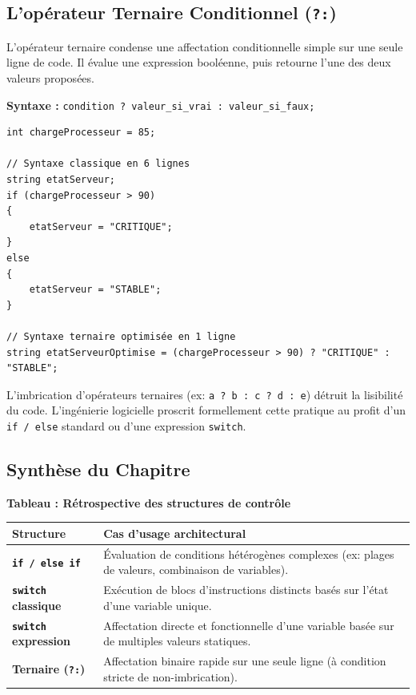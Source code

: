 \subsection{L'opérateur Ternaire Conditionnel (\texttt{?:})}

L'opérateur ternaire condense une affectation conditionnelle simple sur une seule ligne de code. Il évalue une expression booléenne, puis retourne l'une des deux valeurs proposées.

\textbf{Syntaxe :} \texttt{condition ? valeur\_si\_vrai : valeur\_si\_faux;}

\begin{lstlisting}[caption={Optimisation par opérateur ternaire}]
int chargeProcesseur = 85;

// Syntaxe classique en 6 lignes
string etatServeur;
if (chargeProcesseur > 90)
{
    etatServeur = "CRITIQUE";
}
else
{
    etatServeur = "STABLE";
}

// Syntaxe ternaire optimisée en 1 ligne
string etatServeurOptimise = (chargeProcesseur > 90) ? "CRITIQUE" : "STABLE";
\end{lstlisting}

\begin{tcolorbox}[colback=backcolour,colframe=stringcolor,title=\textbf{Anti-pattern : Les ternaires imbriqués}]
    L'imbrication d'opérateurs ternaires (ex: \texttt{a ? b : c ? d : e}) détruit la lisibilité du code. L'ingénierie logicielle proscrit formellement cette pratique au profit d'un \texttt{if / else} standard ou d'une expression \texttt{switch}.
\end{tcolorbox}

\subsection{Synthèse du Chapitre}

\begin{center}
    \textbf{Tableau : Rétrospective des structures de contrôle} \\[0.3cm]
    \begin{tabular}{@{}lp{10cm}@{}}
        \toprule
        \textbf{Structure} & \textbf{Cas d'usage architectural} \\
        \midrule
        \textbf{\texttt{if / else if}} & Évaluation de conditions hétérogènes complexes (ex: plages de valeurs, combinaison de variables). \\
        \textbf{\texttt{switch} classique} & Exécution de blocs d'instructions distincts basés sur l'état d'une variable unique. \\
        \textbf{\texttt{switch} expression} & Affectation directe et fonctionnelle d'une variable basée sur de multiples valeurs statiques. \\
        \textbf{Ternaire (\texttt{?:})} & Affectation binaire rapide sur une seule ligne (à condition stricte de non-imbrication). \\
        \bottomrule
    \end{tabular}
\end{center}
